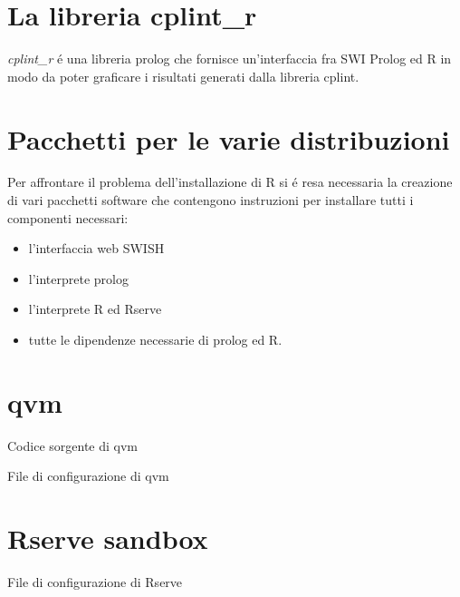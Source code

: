\documentclass[10pt,titlepage,twoside,a4paper]{report}
\newenvironment{code}{\singlespacing\captionsetup{type=listing}}{}
\begin{document}
\chapter{La libreria cplint\_r} \label{La libreria cplint_r}
\emph{cplint\_r} \'e una libreria prolog che fornisce un'interfaccia fra SWI 
Prolog ed R in modo da poter graficare i risultati generati dalla libreria 
cplint.

\chapter{Pacchetti per le varie distribuzioni} \label{Pacchetti per le varie 
distribuzioni}
Per affrontare il problema dell'installazione di R si \'e resa necessaria la 
creazione di vari pacchetti software che contengono instruzioni per installare 
tutti i componenti necessari:
\begin{itemize}
    \item l'interfaccia web SWISH
    \item l'interprete prolog
    \item l'interprete R ed Rserve
    \item tutte le dipendenze necessarie di prolog ed R.
\end{itemize}

\appendix
\chapter{qvm} \label{app:qvm}

\begin{code}
    \caption{Codice sorgente di qvm}
\end{code}

\newpage

\begin{code}
    \caption{File di configurazione di qvm}
\end{code}

\chapter{Rserve sandbox} \label{app:rserve-sandbox}
\begin{code}
    \caption{File di configurazione di Rserve}
\end{code}




\end{document}
